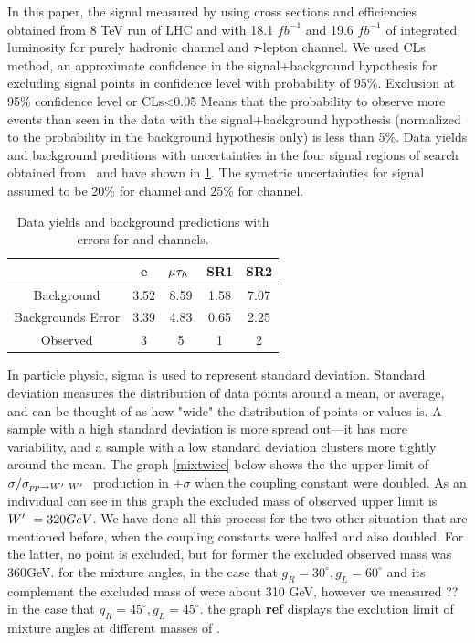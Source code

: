 In this paper, the signal measured by using cross sections and efficiencies obtained from 8 TeV run of LHC and with 18.1 $fb^{-1}$ and 19.6 $fb^{-1}$ of integrated luminosity for purely hadronic channel and $\tau$-lepton channel. We used CLs method, an approximate confidence in the signal+background hypothesis for excluding signal points in confidence level with probability of 95\%. Exclusion at 95\% confidence level or CLs<0.05 Means that the probability to observe more events than seen in the data with the signal+background hypothesis (normalized to the probability in the background hypothesis only) is less than 5\%. Data yields and background preditions with uncertainties in the four signal regions of search obtained from~\cite{Khachatryan:2016trj} and have shown in \ref{tab:yields}. The symetric uncertainties for signal assumed to be 20\% for \lepTau channel and 25\% for \tauTau channel. 

\begin{table}[htb]
	\centering
	\begin{tabular}{|c|c|c|c|c|}
		\hline 
		\wprime  &e\Tau &  $\mu\tau_h~$ & \tauTau SR1 & \tauTau SR2 \\
		\hline 
	         Background &3.52&8.59&1.58&7.07\\     
		 Backgrounds Error& 3.39&4.83&0.65&2.25\\
		 Observed& 3&5&1&2\\
		
		\hline
	\end{tabular}
	\caption{Data yields and background predictions with errors for \lepTau and \tauTau channels. \label{tab:yields} }
\end{table}
 
In particle physic, sigma is used to represent standard deviation. Standard deviation measures the distribution of data points around a mean, or average, and can be thought of as how "wide" the distribution of points or values is. A sample with a high standard deviation is more spread out—it has more variability, and a sample with a low standard deviation clusters more tightly around the mean. The graph \ref{mixtwice} below shows the the upper limit of $\sigma/\sigma_{pp \rightarrow W^\prime~ W^\prime~}$ production in $\pm\sigma$ when the coupling constant were doubled. As an individual can see in this graph the excluded mass of observed upper limit is $W^\prime~=320GeV$.
 We have done all this process for the two other situation that are mentioned before, when the coupling constants were halfed and also doubled. For the latter, no point is excluded, but for former the excluded observed mass was 360GeV.
for the mixture angles, in the case that $g_R=30^\circ,g_L=60^\circ$ and its complement the excluded mass of \wprime were about 310 GeV, however we measured ?? in the case that $g_R=45^\circ,g_L=45^\circ$. the graph {\bf ref} displays the exclution limit of mixture angles at different masses of \wprime.


